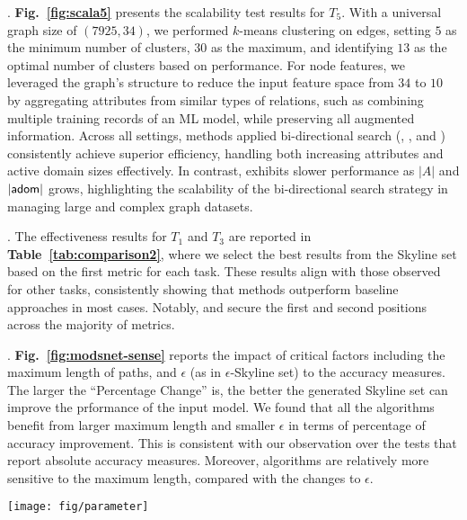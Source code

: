.
\textbf{Fig.~\ref{fig:scala5}} presents the scalability test results for $T_5$. 
With a universal graph size of $(7925, 34)$, we performed $k$-means clustering on edges, setting $5$ as the minimum number of clusters, $30$ as the maximum, and identifying $13$ as the optimal number of clusters based on performance. For node features, we leveraged the graph's structure to reduce the input feature space from $34$ to $10$ by aggregating attributes from similar types of relations, such as combining multiple training records of an ML model, while preserving all augmented information.
Across all settings, methods applied bi-directional search (\bimodis, \nomodis, and \divmodis) consistently achieve superior efficiency, handling both increasing attributes and active domain sizes effectively. In contrast, \apxmodis exhibits slower performance as $\vert A \vert$ and
$\vert {\ensuremath{\mathsf{adom}}} \vert$ grows, highlighting the scalability of the bi-directional search strategy in managing large and complex graph datasets.

. The effectiveness results for $T_1$ and $T_3$ are reported in \textbf{Table~\ref{tab:comparison2}}, where we select the best results from the Skyline set based on the first metric for each task. 
These results align with those observed for other tasks, consistently showing that \modis methods outperform baseline approaches in most cases. Notably, \nomodis and \bimodis secure the first and second positions across the majority of metrics.

.
\textbf{Fig.~\ref{fig:modsnet-sense}}
reports the impact of critical factors including the maximum 
length of paths, and $\epsilon$ (as in $\epsilon$-Skyline set) to 
the accuracy measures. The larger the ``Percentage Change'' is, the better the generated Skyline set can improve the prformance of the input model. We found that all the \modis algorithms benefit from larger maximum length and 
smaller $\epsilon$ in terms of percentage of accuracy improvement. This is consistent with our observation over the tests that report absolute 
accuracy measures. Moreover, \modis algorithms are relatively more sensitive to the maximum length, compared with the changes to $\epsilon$.

\begin{figure*}[h]
\centerline{\texttt{[image: fig/parameter]}}
\centering
\caption{Sensitivity Analysis for Parameters on $T_5$}
\label{fig:modsnet-sense}
\end{figure*}
